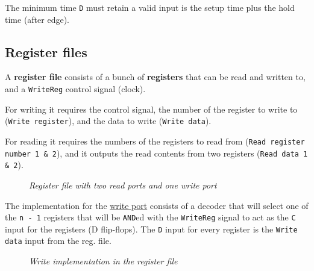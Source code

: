 \documentclass[11pt]{article}
\begin{document}
The minimum time \texttt{D} must retain a valid input is the setup time plus the hold time (after edge).

\subsection*{Register files}

A \textbf{register file} consists of a bunch of \textbf{registers} that can be read and written to, and a \texttt{WriteReg} control signal (clock).

For writing it requires the control signal, the number of the register to write to (\texttt{Write register}), and the data to write (\texttt{Write data}).

For reading it requires the numbers of the registers to read from (\texttt{Read register number 1 \& 2}), and it outputs the read contents from two registers (\texttt{Read data 1 \& 2}).

\begin{figure}[htbp]
    \centering
    \caption{\textit{Register file with two read ports and one write port}}
\end{figure}

The implementation for the \underline{write port} consists of a decoder that will select one of the \texttt{n - 1} registers that will be \texttt{AND}ed with the \texttt{WriteReg} signal to act as the \texttt{C} input for the registers (D flip-flops). The \texttt{D} input for every register is the \texttt{Write data} input from the reg. file.

\begin{figure}[htbp]
    \centering
    \caption{\textit{Write implementation in the register file}}
\end{figure}
\end{document}
